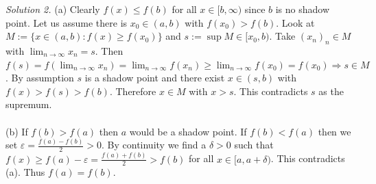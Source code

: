 \begin{solution}
    \textit{Solution 2.}
    (a) Clearly \( f(x)\le f(b) \) for all \( x\in[b,\infty) \) since \( b \) is no shadow point. Let us assume there is \( x_0\in(a,b) \) with \( f(x_0)>f(b) \). Look at \( M:=\{x\in(a,b): f(x)\ge f(x_0)\} \) and \( s:=\sup M\in [x_0,b) \). Take \( (x_n)_n\in M \) with \( \lim_{n\to\infty}x_n=s \). Then \( f(s)=f(\lim_{n\to\infty}x_n)=\lim_{n\to\infty}f(x_n)\ge \lim_{n\to\infty}f(x_0)=f(x_0)\Rightarrow s\in M \). By assumption \( s \) is a shadow point and there exist \( x\in(s,b) \) with \( f(x)>f(s)>f(b) \). Therefore \( x\in M \) with \( x>s \). This contradicts \( s \) as the supremum.\\
    \\
    (b) If \( f(b)>f(a) \) then \( a \) would be a shadow point. \newline If \( f(b)<f(a) \) then we set \( \varepsilon=\frac{f(a)-f(b)}{2}>0 \). By continuity we find a \( \delta>0 \) such that \( f(x)\ge f(a)-\varepsilon=\frac{f(a)+f(b)}{2}>f(b) \) for all \( x\in[a,a+\delta) \). This contradicts (a). Thus \( f(a)=f(b) \).
\end{solution}
